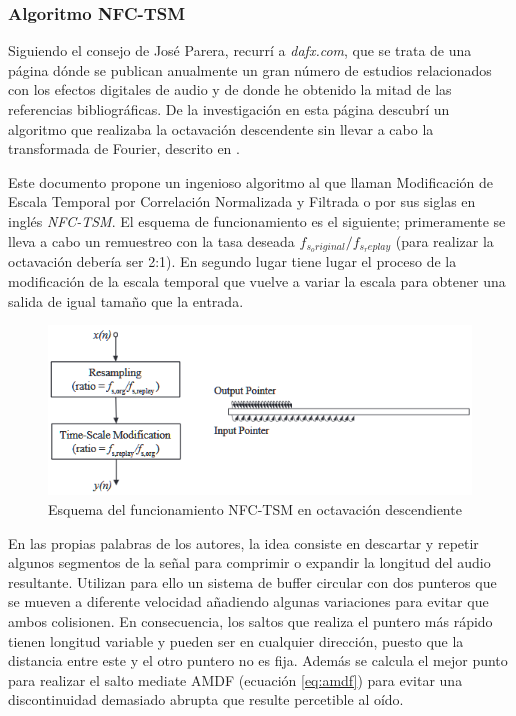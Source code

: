 \subsubsection{Algoritmo NFC-TSM}
Siguiendo el consejo de José Parera, recurrí a \emph{dafx.com}, que se trata de una página dónde se publican anualmente un gran número de estudios relacionados con los efectos digitales de audio y de donde he obtenido la mitad de las referencias bibliográficas. De la investigación en esta página descubrí un algoritmo que realizaba la octavación descendente sin llevar a cabo la transformada de Fourier, descrito en \cite{nfctsm}.

Este documento propone un ingenioso algoritmo al que llaman Modificación de Escala Temporal por Correlación Normalizada y Filtrada o por sus siglas en inglés \emph{NFC-TSM}. El esquema de funcionamiento es el siguiente; primeramente se lleva a cabo un remuestreo con la tasa deseada $f_{s_original}/f_{s_replay}$ (para realizar la octavación debería ser 2:1). En segundo lugar tiene lugar el proceso de la modificación de la escala temporal que vuelve a variar la escala para obtener una salida de igual tamaño que la entrada.

\begin{figure}[!ht]
\begin{center}
\includegraphics[width=12cm]{img/nfc-tsm.png}
\caption{\label{fig:tsm}Esquema del funcionamiento NFC-TSM en octavación descendiente}
\end{center}
\end{figure}

En las propias palabras de los autores, la idea consiste en descartar y repetir algunos segmentos de la señal para comprimir o expandir la longitud del audio resultante. Utilizan para ello un sistema de buffer circular con dos punteros que se mueven a diferente velocidad añadiendo algunas variaciones para evitar que ambos colisionen. En consecuencia, los saltos que realiza el puntero más rápido tienen longitud variable y pueden ser en cualquier dirección, puesto que la distancia entre este y el otro puntero no es fija. Además se calcula el mejor punto para realizar el salto mediate AMDF (ecuación \ref{eq:amdf}) para evitar una discontinuidad demasiado abrupta que resulte percetible al oído. 

